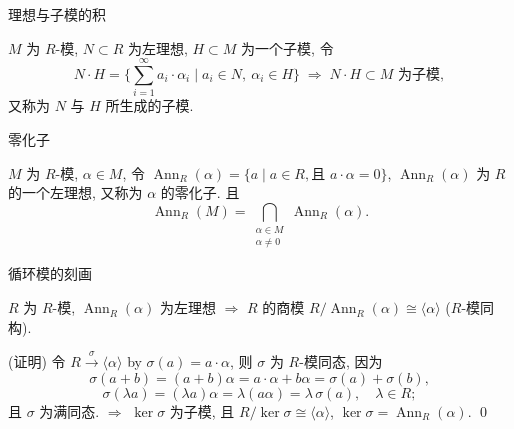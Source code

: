 
\begin{frame}{理想与子模的积}

\begin{eg}[理想与子模的积]
$M$ 为 $R$-模, $N \subset R$ 为左理想, $H \subset M$ 为一个子模,
令
\[
N \cdot H = \Big\{ \sum_{i=1}^{\infty} a_i \cdot \alpha_i \;\Big|\; a_i \in N,\ \alpha_i \in H \Big\}
\;\Longrightarrow\; N \cdot H \subset M \text{ 为子模},
\]
又称为 $N$ 与 $H$ 所生成的子模.
\end{eg}

\end{frame}


\begin{frame}{零化子}

\begin{eg}[零化子]
$M$ 为 $R$-模, $\alpha \in M$, 令
$\operatorname{Ann}_R(\alpha) = \{ a \mid a \in R, \text{且 } a \cdot \alpha = 0 \}$,
$\operatorname{Ann}_R(\alpha)$ 为 $R$ 的一个左理想, 又称为 $\alpha$ 的零化子.
且
\[
\operatorname{Ann}_R(M)
= \bigcap_{\substack{\alpha \in M \\ \alpha \neq 0}} \operatorname{Ann}_R(\alpha).
\]
\end{eg}

\end{frame}


\begin{frame}{循环模的刻画}

\begin{prop}[循环模的刻画]
$R$ 为 $R$-模, $\operatorname{Ann}_R(\alpha)$ 为左理想
$\Longrightarrow$ $R$ 的商模 $R/\operatorname{Ann}_R(\alpha) \cong \langle \alpha \rangle$
($R$-模同构).
\end{prop}

\startproof[bg=yellow, fg=red](证明)
令 $R \xrightarrow{\ \sigma\ } \langle \alpha \rangle$ by
$\sigma(a) = a \cdot \alpha$, 则 $\sigma$ 为 $R$-模同态,
因为
\[
\sigma(a+b) = (a+b)\alpha = a\cdot\alpha + b\alpha = \sigma(a) + \sigma(b),
\]
\[
\sigma(\lambda a) = (\lambda a)\alpha = \lambda(a\alpha) = \lambda\,\sigma(a),
\quad \lambda \in R;
\]
且 $\sigma$ 为满同态.
\pause
$\Longrightarrow$ $\ker \sigma$ 为子模, 且 $R/\ker\sigma \cong \langle \alpha \rangle$,
$\ker \sigma = \operatorname{Ann}_R(\alpha)$.
\qed

\end{frame}

